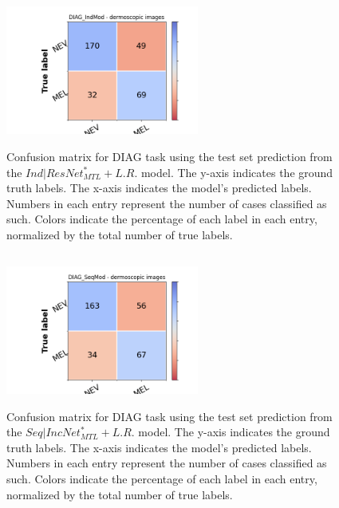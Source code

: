 \subsection{\texorpdfstring{}{TEXT}}
\begin{figure}[ht]
\centering
{\includegraphics[width =2.5in]{images/appendice/resnet+lr/DIAG_CM_IndMod.png}}
\caption{Confusion matrix for DIAG task using the test set prediction
from the $Ind|ResNet^*_{MTL}+L.R.$ model. The y-axis indicates the ground truth labels. The x-axis indicates the model’s predicted labels. Numbers in each entry represent
the number of cases classified as such. Colors indicate the percentage of each
label in each entry, normalized by the total number of true labels.}
\label{IndresNet+lrCM}
\end{figure}
\clearpage

\subsection{\texorpdfstring{}{TEXT}}
\begin{figure}[ht]
\centering
{\includegraphics[width =2.5in]{images/appendice/incnet+lr/DIAG_CM_SeqMod.png}}
\caption{Confusion matrix for DIAG task using the test set prediction
from the $Seq|IncNet^*_{MTL}+L.R.$ model. The y-axis indicates the ground truth labels. The x-axis indicates the model’s predicted labels. Numbers in each entry represent
the number of cases classified as such. Colors indicate the percentage of each
label in each entry, normalized by the total number of true labels.}
\label{SeqincNet+lrCM}
\end{figure}

